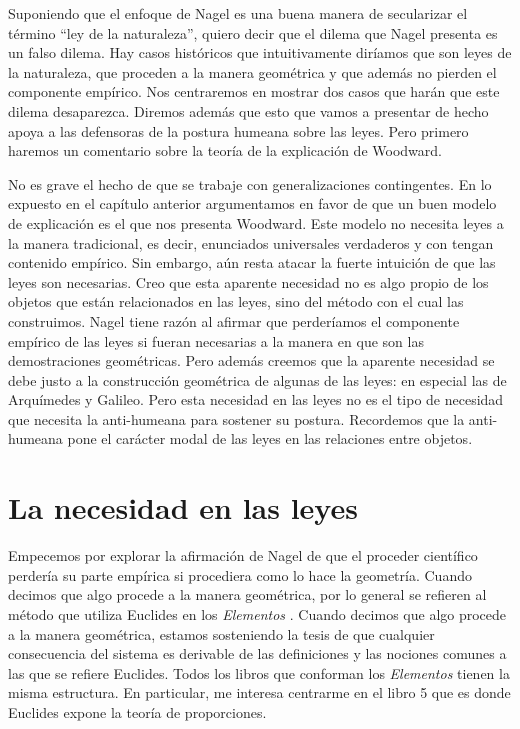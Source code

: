 Suponiendo que el enfoque de Nagel es una buena manera de secularizar el término ``ley de la naturaleza'', quiero decir que el dilema que Nagel presenta es un falso dilema. Hay casos históricos que intuitivamente diríamos que son leyes de la naturaleza, que proceden a la manera geométrica y que además no pierden el componente empírico. Nos centraremos en mostrar dos casos que harán que este dilema desaparezca. Diremos además que esto que vamos a presentar de hecho apoya a las defensoras de la postura humeana sobre las leyes. Pero primero haremos un comentario sobre la teoría de la explicación de Woodward.

No es grave el hecho de que se trabaje con generalizaciones contingentes. En lo expuesto en el capítulo anterior argumentamos en favor de que un buen modelo de explicación es el que nos presenta Woodward. Este modelo no necesita leyes a la manera tradicional, es decir, enunciados universales verdaderos y con tengan contenido empírico. Sin embargo, aún resta atacar la fuerte intuición de que las leyes son necesarias. Creo que esta aparente necesidad no es algo propio de los objetos que están relacionados en las leyes, sino del método con el cual las construimos. Nagel tiene razón al afirmar que perderíamos el componente empírico de las leyes si fueran necesarias a la manera en que son las demostraciones geométricas. Pero además creemos que la aparente necesidad se debe justo a la construcción geométrica de algunas de las leyes: en especial las de Arquímedes y Galileo. Pero esta necesidad en las leyes no es el tipo de necesidad que necesita la anti-humeana para sostener su postura. Recordemos que la anti-humeana pone el carácter modal de las leyes en las relaciones entre objetos.

\section{La necesidad en las leyes}

\noindent Empecemos por explorar la afirmación de Nagel de que el proceder científico perdería su parte empírica si procediera como lo hace la geometría. Cuando decimos que algo procede a la manera geométrica, por lo general se refieren al método que utiliza Euclides en los \emph{Elementos} \cite{Euclid2008}. Cuando decimos que algo procede a la manera geométrica, estamos sosteniendo la tesis de que cualquier consecuencia del sistema es derivable de las definiciones y las nociones comunes a las que se refiere Euclides. Todos los libros que conforman los \emph{Elementos} tienen la misma estructura. En particular, me interesa centrarme en el libro 5 que es donde Euclides expone la teoría de proporciones.

